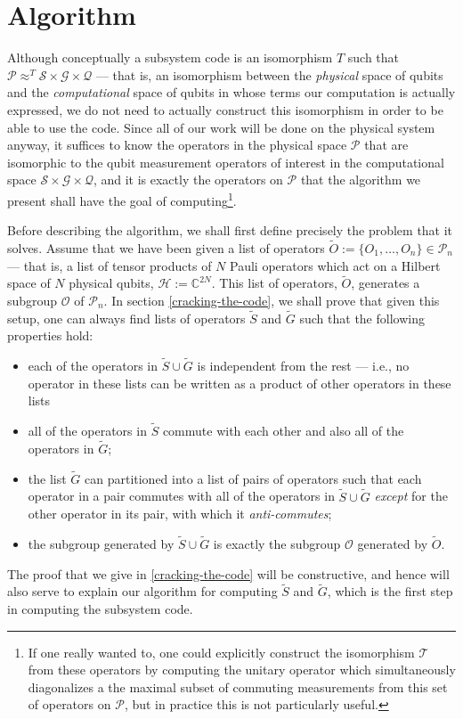 \documentclass[twocolumn,showpacs,preprintnumbers,amsmath,amssymb,nofootinbib,pra,floatfix]{revtex4}
\begin{document}
\section{Algorithm}

Although conceptually a subsystem code is an isomorphism $T$ such that  $\mathscr{P}\approx^T \mathscr{S}\times\mathscr{G}\times\mathscr{Q}$ --- that is, an isomorphism between the \emph{physical} space of qubits and the \emph{computational} space of qubits in whose terms our computation is actually expressed, we do not need to actually construct this isomorphism in order to be able to use the code.  Since all of our work will be done on the physical system anyway, it suffices to know the operators in the physical space $\mathscr{P}$ that are isomorphic to the qubit measurement operators of interest in the computational space $\mathscr{S}\times\mathscr{G}\times\mathscr{Q}$, and it is exactly the operators on $\mathscr{P}$ that the algorithm we present shall have the goal of computing\footnote{If one really wanted to, one could explicitly construct the isomorphism $\mathscr{T}$ from these operators by computing the unitary operator which simultaneously diagonalizes a the maximal subset of commuting measurements from this set of operators on $\mathscr{P}$, but in practice this is not particularly useful.}.

Before describing the algorithm, we shall first define precisely the
problem that it solves.  Assume that we have been given a list of operators $\tilde O
:=\{O_1,\dots,O_n\}\in \mathcal{P}_n$ --- that is, a list of tensor
products of $N$ Pauli operators which act on a Hilbert space of $N$
physical qubits, $\mathscr{H}:=\mathbb{C}^{2N}$.  This list of
operators, $\tilde O$, generates a subgroup $\mathcal{O}$ of
$\mathcal{P}_n$.  In section \ref{cracking-the-code}, we shall prove
that given this setup, one can always find lists of operators $\tilde S$
and $\tilde G$ such that the following properties hold:
\begin{itemize}
\item each of the operators in $\tilde S \cup \tilde G$ is
  independent from the rest --- i.e., no operator in these lists can
  be written as a product of other operators in these lists
\item all of the operators in $\tilde S$ commute with each other and
  also all of the operators in $\tilde G$;
\item the list $\tilde G$ can partitioned into a list of pairs of
  operators such that each operator in a pair commutes with all of the
  operators in $\tilde S \cup \tilde G$ \emph{except} for the other
  operator in its pair, with which it \emph{anti-commutes};
\item the subgroup generated by $\tilde S \cup \tilde G$ is exactly
  the subgroup $\mathcal{O}$ generated by $\tilde O$.
\end{itemize}
The proof that we give in \ref{cracking-the-code} will be
constructive, and hence will also serve to explain our algorithm for
computing $\tilde S$ and $\tilde G$, which is the first step in
computing the subsystem code.
\end{document}
